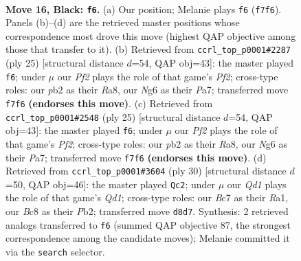 \documentclass[11pt]{article}
\begin{document}
\clearpage

\begin{figure}[p]\centering
\begin{subfigure}{0.46\textwidth}\centering
\resizebox{\linewidth}{!}{%
\newchessgame
\chessboard[
  setfen={r1bq1rk1/ppb2ppp/6n1/3p2B1/B7/3P1N1P/PPP2PP1/R2QR1K1 b - - 6 16},
  showmover=false,
  pgfstyle=straightmove, color=movearrow, markmove={f7-f6}
]}
\caption{}
\end{subfigure}\hfill
\begin{subfigure}{0.46\textwidth}\centering
\resizebox{\linewidth}{!}{%
\newchessgame
\chessboard[
  setfen={r1bq1rk1/p4ppp/1p1bp3/3n2B1/3P4/1B3N2/PP3PPP/R2QR1K1 b - - 1 13},
  showmover=false,
  pgfstyle=straightmove, color=movearrow, markmove={f7-f6}
]}
\caption{}
\end{subfigure}
\\[4pt]
\begin{subfigure}{0.46\textwidth}\centering
\resizebox{\linewidth}{!}{%
\newchessgame
\chessboard[
  setfen={r1bq1rk1/p4ppp/1p1bp3/3n2B1/3P4/1B3N2/PP3PPP/R2QR1K1 b - - 1 13},
  showmover=false,
  pgfstyle=straightmove, color=movearrow, markmove={f7-f6}
]}
\caption{}
\end{subfigure}\hfill
\begin{subfigure}{0.46\textwidth}\centering
\resizebox{\linewidth}{!}{%
\newchessgame
\chessboard[
  setfen={r2q1rk1/5ppp/2pb1n2/p2p4/N5b1/3PB1P1/PP3PBP/R2Q1RK1 w - - 3 16},
  showmover=false,
  pgfstyle=straightmove, color=movearrow, markmove={d1-c2}
]}
\caption{}
\end{subfigure}
\caption{\textbf{Move 16, Black: \texttt{f6}.} (a) Our position; Melanie plays \texttt{f6} (\texttt{f7f6}). Panels (b)--(d) are the retrieved master positions whose correspondence most drove this move (highest QAP objective among those that transfer to it). (b) Retrieved from \texttt{ccrl\_top\_p0001\#2287} (ply 25) [structural distance $d$=54, QAP obj=43]: the master played \texttt{f6}; under $\mu$ our \emph{Pf2} plays the role of that game's \emph{Pf2}; cross-type roles: our \emph{p}b2 as their \emph{R}a8, our \emph{N}g6 as their \emph{P}a7; transferred move \texttt{f7f6} \textbf{(endorses this move)}. (c) Retrieved from \texttt{ccrl\_top\_p0001\#2548} (ply 25) [structural distance $d$=54, QAP obj=43]: the master played \texttt{f6}; under $\mu$ our \emph{Pf2} plays the role of that game's \emph{Pf2}; cross-type roles: our \emph{p}b2 as their \emph{R}a8, our \emph{N}g6 as their \emph{P}a7; transferred move \texttt{f7f6} \textbf{(endorses this move)}. (d) Retrieved from \texttt{ccrl\_top\_p0001\#3604} (ply 30) [structural distance $d$=50, QAP obj=46]: the master played \texttt{Qc2}; under $\mu$ our \emph{Qd1} plays the role of that game's \emph{Qd1}; cross-type roles: our \emph{B}c7 as their \emph{R}a1, our \emph{B}c8 as their \emph{P}b2; transferred move \texttt{d8d7}. Synthesis: 2 retrieved analogs transferred to \texttt{f6} (summed QAP objective 87, the strongest correspondence among the candidate moves); Melanie committed it via the \texttt{search} selector.}
\label{fig:thought-m31}
\end{figure}
\end{document}
